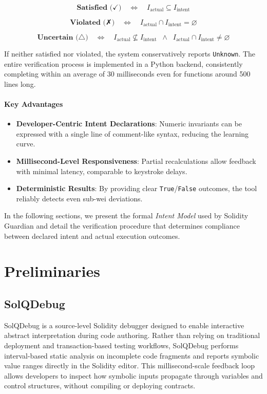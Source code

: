 \documentclass[10pt, conference]{IEEEtran}
\begin{document}
\[
  \textbf{Satisfied (✓)} \quad \Longleftrightarrow \quad
    I_{\text{actual}} \subseteq I_{\text{intent}}
\]

\[
  \textbf{Violated (✗)} \quad \Longleftrightarrow \quad
    I_{\text{actual}} \cap I_{\text{intent}} = \varnothing
\]

\[
  \textbf{Uncertain (△)} \quad \Longleftrightarrow \quad
    I_{\text{actual}} \not\subseteq I_{\text{intent}} 
    \;\;\wedge\;\; I_{\text{actual}} \cap I_{\text{intent}} \neq \varnothing
\]

If neither satisfied nor violated, the system conservatively reports \texttt{Unknown}.  
The entire verification process is implemented in a Python backend, consistently completing within an average of 30 milliseconds even for functions around 500 lines long.

\paragraph{Key Advantages}
\begin{itemize}
    \item \textbf{Developer-Centric Intent Declarations}:  
    Numeric invariants can be expressed with a single line of comment-like syntax, reducing the learning curve.
    
    \item \textbf{Millisecond-Level Responsiveness}:  
    Partial recalculations allow feedback with minimal latency, comparable to keystroke delays.
    
    \item \textbf{Deterministic Results}:  
    By providing clear \texttt{True}/\texttt{False} outcomes, the tool reliably detects even sub-wei deviations.
\end{itemize}

In the following sections, we present the formal \textit{Intent Model} used by Solidity Guardian and detail the verification procedure that determines compliance between declared intent and actual execution outcomes.


\section{Preliminaries}

\subsection{SolQDebug}

SolQDebug is a source-level Solidity debugger designed to enable interactive abstract interpretation during code authoring. Rather than relying on traditional deployment and transaction-based testing workflows, SolQDebug performs interval-based static analysis on incomplete code fragments and reports symbolic value ranges directly in the Solidity editor. This millisecond-scale feedback loop allows developers to inspect how symbolic inputs propagate through variables and control structures, without compiling or deploying contracts.
\end{document}
